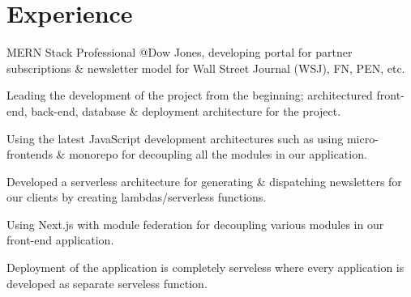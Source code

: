 \documentclass[]{ayush-gupta-resume-openfont}
\begin{document}
\begin{minipage}[t]{0.62\textwidth} 


\section{Experience}
\vspace{\topsep} %
\begin{tightemize}
\item MERN Stack Professional @Dow Jones, developing portal for partner subscriptions \& newsletter model for Wall Street Journal (WSJ), FN, PEN, etc.
\item Leading the development of the project from the beginning; architectured front-end, back-end, database \& deployment architecture for the project.
\item Using the latest JavaScript development architectures such as using micro-frontends \& monorepo for decoupling all the modules in our application.
\item Developed a serverless architecture for generating \& dispatching newsletters for our clients by creating lambdas/serverless functions.
\item Using Next.js with module federation for decoupling various modules in our front-end application.
\item Deployment of the application is completely serveless where every application is developed as separate serveless function.
\end{tightemize}
\sectionsep


\end{minipage}
\end{document}
